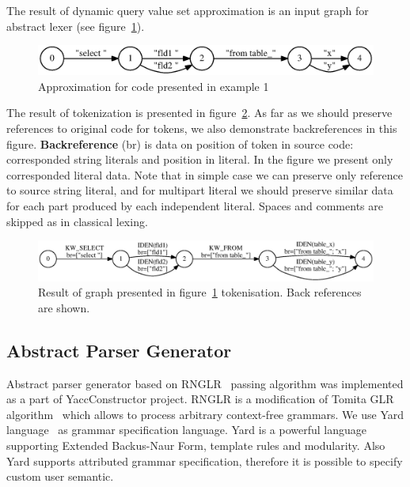 \documentclass{acm_proc_article-sp}
\begin{document}
The result of dynamic query value set approximation is an input graph for abstract lexer (see figure~\ref{lexer_input}).

\begin{figure}[h!]
    \begin{center}
        \includegraphics[scale=0.4]{graphs/lexer_example.eps}
    \end{center}
    \caption{Approximation for code presented in example 1}
    \label{lexer_input}
\end{figure}


The result of tokenization is presented in figure~\ref{tokens}. As far as we should preserve references to original code for tokens, we also demonstrate backreferences in this figure. {\bf Backreference} (br) is data on position of token in source code: corresponded string literals and position in literal. In the figure we present only corresponded literal data. Note that in simple case we can preserve only reference to source string literal, and for multipart literal we should preserve similar data for each part produced by each independent literal. Spaces and comments are skipped as in classical lexing.


\begin{figure}%
    \begin{center}
        \includegraphics[scale=0.32]{graphs/lexer_example_tok.eps}
    \end{center}
    \caption{Result of graph presented in figure~\ref{lexer_input} tokenisation. Back references are shown.}
    \label{tokens}
\end{figure}



\subsection{Abstract Parser Generator}

Abstract parser generator based on RNGLR~\cite{RNGLR} passing algorithm was implemented as a part of YaccConstructor project. RNGLR is a modification of Tomita GLR algorithm~\cite{Tomita} which allows to process arbitrary context-free grammars. We use Yard language~\cite{YARD} as grammar specification language. Yard is a powerful language supporting Extended Backus-Naur Form, template rules and modularity. Also Yard supports attributed grammar specification, therefore it is possible to specify custom user semantic. 
\end{document}
